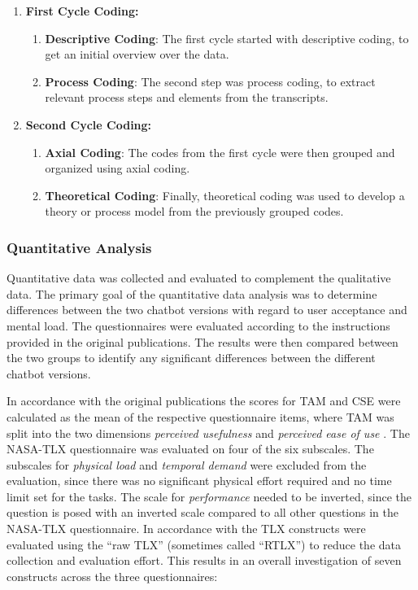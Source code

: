 \begin{enumerate}
    \item \textbf{First Cycle Coding:}
    \begin{enumerate}
        \item \textbf{Descriptive Coding}: The first cycle started with descriptive coding, to get an initial overview over the data.
        \item \textbf{Process Coding}: The second step was process coding, to extract relevant process steps and elements from the transcripts.
    \end{enumerate}
    \item \textbf{Second Cycle Coding:}
    \begin{enumerate}
        \item \textbf{Axial Coding}: The codes from the first cycle were then grouped and organized using axial coding.
        \item \textbf{Theoretical Coding}: Finally, theoretical coding was used to develop a theory or process model from the previously grouped codes.
    \end{enumerate}
\end{enumerate}

\subsubsection{Quantitative Analysis} \label{sssec:quantitative_analysis}

Quantitative data was collected and evaluated to complement the qualitative data. The primary goal of the quantitative data analysis was to determine differences between the two chatbot versions with regard to user acceptance and mental load. The questionnaires were evaluated according to the instructions provided in the original publications. The results were then compared between the two groups to identify any significant differences between the different chatbot versions.

In accordance with the original publications the scores for TAM and CSE were calculated as the mean of the respective questionnaire items, where TAM was split into the two dimensions \textit{perceived usefulness} and \textit{perceived ease of use} \parencite{Davis1989,Compeau1995}. The \acs{NASA}-\ac{TLX} questionnaire was evaluated on four of the six subscales. The subscales for \textit{physical load} and \textit{temporal demand} were excluded from the evaluation, since there was no significant physical effort required and no time limit set for the tasks. The scale for \textit{performance} needed to be inverted, since the question is posed with an inverted scale compared to all other questions in the \acs{NASA}-\ac{TLX} questionnaire. In accordance with \textcite{Hart2006} the \ac{TLX} constructs were evaluated using the “raw TLX” (sometimes called “RTLX”) to reduce the data collection and evaluation effort. This results in an overall investigation of seven constructs across the three questionnaires:

